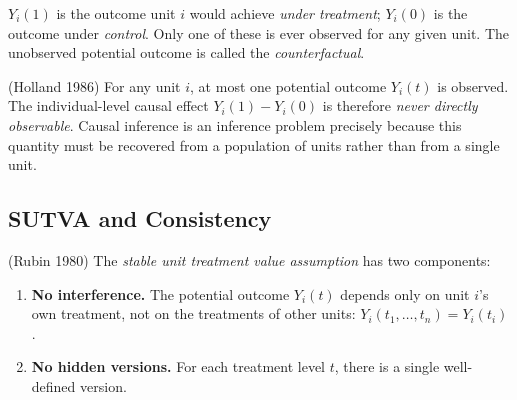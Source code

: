 \documentclass[
  a4paper,
]{book}
\providecommand{\tightlist}{%
  \setlength{\itemsep}{0pt}\setlength{\parskip}{0pt}}
\begin{document}
\(Y_i(1)\) is the outcome unit \(i\) would achieve \emph{under
treatment}; \(Y_i(0)\) is the outcome under \emph{control}. Only one of
these is ever observed for any given unit. The unobserved potential
outcome is called the \emph{counterfactual}.

\begin{tcolorbox}[enhanced jigsaw, arc=.35mm, bottomrule=.15mm, bottomtitle=1mm, breakable, colback=white, colbacktitle=quarto-callout-warning-color!10!white, colframe=quarto-callout-warning-color-frame, coltitle=black, left=2mm, leftrule=.75mm, opacityback=0, opacitybacktitle=0.6, rightrule=.15mm, title={The Fundamental Problem of Causal Inference}, titlerule=0mm, toprule=.15mm, toptitle=1mm]

(Holland 1986) For any unit \(i\), at most one potential outcome
\(Y_i(t)\) is observed. The individual-level causal effect
\(Y_i(1) - Y_i(0)\) is therefore \emph{never directly observable}.
Causal inference is an inference problem precisely because this quantity
must be recovered from a population of units rather than from a single
unit.

\end{tcolorbox}

\subsection{SUTVA and Consistency}\label{sutva-and-consistency}

\begin{tcolorbox}[enhanced jigsaw, arc=.35mm, bottomrule=.15mm, bottomtitle=1mm, breakable, colback=white, colbacktitle=quarto-callout-note-color!10!white, colframe=quarto-callout-note-color-frame, coltitle=black, left=2mm, leftrule=.75mm, opacityback=0, opacitybacktitle=0.6, rightrule=.15mm, title={Definition: SUTVA}, titlerule=0mm, toprule=.15mm, toptitle=1mm]

(Rubin 1980) The \emph{stable unit treatment value assumption} has two
components:

\begin{enumerate}
\def\labelenumi{\arabic{enumi}.}
\tightlist
\item
  \textbf{No interference.} The potential outcome \(Y_i(t)\) depends
  only on unit \(i\)'s own treatment, not on the treatments of other
  units: \(Y_i(t_1, \ldots, t_n) = Y_i(t_i)\).
\item
  \textbf{No hidden versions.} For each treatment level \(t\), there is
  a single well-defined version.
\end{enumerate}

\end{tcolorbox}
\end{document}
